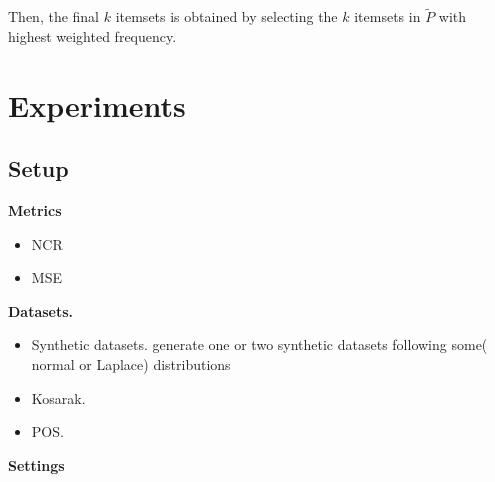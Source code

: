 \documentclass[conference]{IEEEtran}
\begin{document}

Then, the final $k$ itemsets is obtained by selecting the $k$ itemsets in $\tilde{P}$ with highest weighted frequency.




\section{Experiments}
\subsection{Setup}
\textbf{Metrics}
\begin{itemize}
\item NCR
\item MSE
\end{itemize}

\textbf{Datasets.}
\begin{itemize}
\item Synthetic datasets. {\color{red} generate one or two synthetic datasets following some( normal or Laplace) distributions}
\item Kosarak.
\item POS.
\end{itemize}

\textbf{Settings}
\end{document}
